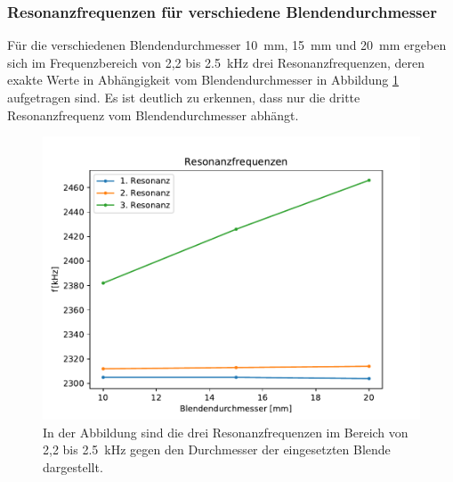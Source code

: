        \subsubsection*{Resonanzfrequenzen für verschiedene Blendendurchmesser}
            Für die verschiedenen Blendendurchmesser \SI{10}{\milli\metre}, \SI{15}{\milli\metre} und \SI{20}{\milli\metre} ergeben sich im Frequenzbereich von 2,2 bis \SI{2.5}{\kilo\hertz} drei 
            Resonanzfrequenzen, deren exakte Werte in Abhängigkeit vom Blendendurchmesser in Abbildung \ref{fig:res_freq_gegen_d_blende} aufgetragen sind. Es ist deutlich zu erkennen, dass nur die dritte
            Resonanzfrequenz vom Blendendurchmesser abhängt. 
            \begin{figure}[ht]
                \centering
                \includegraphics[scale=0.6]{./pictures/res_freq_gegen_d_blende.pdf}
                \caption{In der Abbildung sind die drei Resonanzfrequenzen im Bereich von 2,2 bis \SI{2.5}{\kilo\hertz} gegen den Durchmesser der eingesetzten Blende dargestellt.}
                \label{fig:res_freq_gegen_d_blende}
            \end{figure}
        \FloatBarrier
        \newpage
